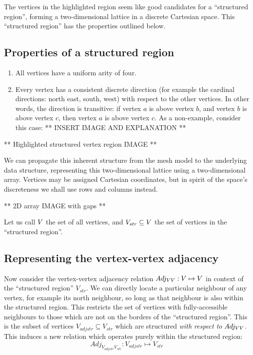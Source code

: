 The vertices in the highlighted region seem like good candidates for a ``structured region'', forming a two-dimensional lattice in a discrete Cartesian space. This ``structured region'' has the properties outlined below.

\subsection{Properties of a structured region}
\label{sec:structured-region-properties}
\begin{enumerate}
\item All vertices have a uniform arity of four.
\item Every vertex has a consistent discrete direction (for example the cardinal directions: north east, south, west) with respect to the other vertices. In other words, the direction is transitive: if vertex $a$ is above vertex $b$, and vertex $b$ is above vertex $c$, then vertex $a$ is above vertex $c$. As a non-example, consider this case:
** INSERT IMAGE AND EXPLANATION **
\end{enumerate}


** Highlighted structured vertex region IMAGE **

We can propagate this inherent structure from the mesh model to the underlying data structure, representing this two-dimensional lattice using a two-dimensional array. Vertices may be assigned Cartesian coordinates, but in spirit of the space's discreteness we shall use rows and columns instead.

** 2D array IMAGE with gaps **


\newcommand{\strV}{V_{str}}
\newcommand{\adjstrV}{V_{adjstr}}
\newcommand{\AdjVVstr}{Adj_{\adjstrV\strV}}

Let us call $V$ the set of all vertices, and $\strV \subseteq \VertexSet$ the set of vertices in the ``structured region''.

\subsection{Representing the vertex-vertex adjacency}

Now consider the vertex-vertex adjacency relation $Adj_{VV}: V \mapsto V$ in context of the ``structured region'' $\strV$. We can directly locate a particular neighbour of any vertex, for example its north neighbour, so long as that neighbour is also within the structured region. This restricts the set of vertices with fully-accessible neighbours to those which are not on the borders of the ``structured region''. This is the subset of vertices $\adjstrV \subseteq \strV$ which are structured \emph{with respect to} $Adj_{VV}$. This induces a new relation which operates purely within the structured region:
$$\AdjVVstr: \adjstrV \mapsto \strV$$

